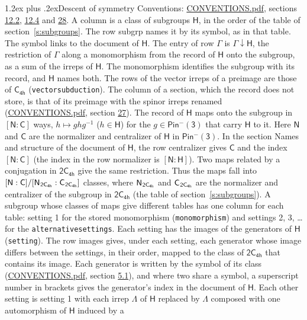 \documentclass[10pt,a4paper]{article}
\makeatletter
\renewcommand\section{\@startsection{section}{1}{\z@}{-3ex plus -1ex minus -.2ex}%
  {1.2ex plus .2ex}{\normalfont\large\sffamily\bfseries\color{parttitle}}}
\numberwithin{equation}{section}
\newcommand{\grp}[1]{\mathsf{#1}}
\newcommand{\grpindex}[2]{[#1 : #2]}
\newcommand{\restr}[2]{#1\!\downarrow#2}
\newcommand{\hairsp}{\mkern1mu}
\makeatother
\begin{document}
\section{Descent of symmetry}\label{s:subduction}
Conventions: \href{../../CONVENTIONS.pdf}{CONVENTIONS.pdf}, sections \href{../../../rotation/CONVENTIONS.pdf\#conv.12.2}{12.2}, \href{../../../rotation/CONVENTIONS.pdf\#conv.12.4}{12.4} and \href{../../CONVENTIONS.pdf\#conv.28}{28}.
A column is a class of subgroups $\grp{H}$, in the order of the table of section~\ref{s:subgroups}. The row subgrp names it by its symbol, as in that table. The symbol links to the document of $\grp{H}$. The entry of row $\Gamma$ is $\restr{\Gamma}{\grp{H}}$, the restriction of $\Gamma$ along a monomorphism from the record of $\grp{H}$ onto the subgroup, as a sum of the irreps of $\grp{H}$. The monomorphism identifies the subgroup with its record, and $\grp{H}$ names both. The rows of the vector irreps of a preimage are those of \href{../../../rotation/data/pdf/C4h.pdf}{$\grp{C_{4h}}$} (\texttt{vectorsubduction}). The column of a section, which the record does not store, is that of its preimage with the spinor irreps renamed (\href{../../CONVENTIONS.pdf}{CONVENTIONS.pdf}, section \href{../../CONVENTIONS.pdf\#conv.27}{27}). \label{n:group.normalizer.o3}\label{n:group.centralizer.o3}\label{n:element.h}The record of $\grp{H}$ maps onto the subgroup in $\grpindex{\grp{N}}{\grp{C}}$ ways, $h \mapsto g h g^{-1}$ ($h \in \grp{H}$) for the $g \in \grp{Pin^{-}(3)}$ that carry $\grp{H}$ to it. Here $\grp{N}$ and $\grp{C}$ are the normalizer and centralizer of $\grp{H}$ in \href{Pinminus3.pdf}{$\grp{Pin^{-}(3)}$}. In the section Names and structure of the document of $\grp{H}$, the row centralizer gives $\grp{C}$ and the index $\grpindex{\grp{N}}{\grp{C}}$ (the index in the row normalizer is $\grpindex{\grp{N}}{\grp{H}}$). Two maps related by a conjugation in $\grp{2C_{4h}}$ give the same restriction. Thus the maps fall into $\grpindex{\grp{N}}{\grp{C}}/\grpindex{\grp{N}_{\hairsp \grp{2C_{4h}}}}{\grp{C}_{\hairsp \grp{2C_{4h}}}}$ classes, where $\grp{N}_{\hairsp \grp{2C_{4h}}}$ and $\grp{C}_{\hairsp \grp{2C_{4h}}}$ are the normalizer and centralizer of the subgroup in $\grp{2C_{4h}}$ (the table of section~\ref{s:subgroups}). \label{n:head.setting}A subgroup whose classes of maps give different tables has one column for each table: setting 1 for the stored monomorphism (\texttt{monomorphism}) and settings 2, 3, \dots{} for the \texttt{alternativesettings}. Each setting has the images of the generators of $\grp{H}$ (\texttt{setting}). \label{n:head.images}The row images gives, under each setting, each generator whose image differs between the settings, in their order, mapped to the class of $\grp{2C_{4h}}$ that contains its image. Each generator is written by the symbol of its class (\href{../../CONVENTIONS.pdf}{CONVENTIONS.pdf}, section \href{../../../rotation/CONVENTIONS.pdf\#conv.5.1}{5.1}), and where two share a symbol, a superscript number in brackets gives the generator's index in the document of $\grp{H}$. \label{n:irrep.Delta}Each other setting is setting 1 with each irrep $\Lambda$ of $\grp{H}$ replaced by $\Lambda$ composed with one automorphism of $\grp{H}$ induced by a 
\end{document}
